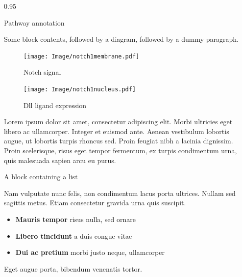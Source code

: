 \documentclass[final]{beamer}
\newlength{\sepwidth}
\newlength{\colwidth}
\newcommand{\separatorcolumn}{\begin{column}{\sepwidth}\end{column}}
\begin{document}
\begin{frame}[t]
\begin{columns}[t]
\separatorcolumn

\begin{column}{0.95\colwidth}

  \begin{block}{Pathway annotation}

    Some block contents, followed by a diagram, followed by a dummy paragraph.

    \begin{figure}
      \centering
      \footnotesize
      \begin{minipage}{0.45\textwidth}
        \texttt{[image: Image/notch1membrane.pdf]}
        \caption{Notch signal}
      \end{minipage}
      \hspace{2.5cm}
      \begin{minipage}{0.45\textwidth}
        \texttt{[image: Image/notch1nucleus.pdf]}
        \caption{Dll ligand expression}
        \label{fig:li_in}
      \end{minipage}
    \end{figure}

    Lorem ipsum dolor sit amet, consectetur adipiscing elit. Morbi ultricies
    eget libero ac ullamcorper. Integer et euismod ante. Aenean vestibulum
    lobortis augue, ut lobortis turpis rhoncus sed. Proin feugiat nibh a
    lacinia dignissim. Proin scelerisque, risus eget tempor fermentum, ex
    turpis condimentum urna, quis malesuada sapien arcu eu purus.

  \end{block}

  \begin{block}{A block containing a list}

    Nam vulputate nunc felis, non condimentum lacus porta ultrices. Nullam sed
    sagittis metus. Etiam consectetur gravida urna quis suscipit.

    \begin{itemize}
      \item \textbf{Mauris tempor} risus nulla, sed ornare
      \item \textbf{Libero tincidunt} a duis congue vitae
      \item \textbf{Dui ac pretium} morbi justo neque, ullamcorper
    \end{itemize}

    Eget augue porta, bibendum venenatis tortor.


\end{block}
\end{column}
\end{columns}
\end{frame}
\end{document}
